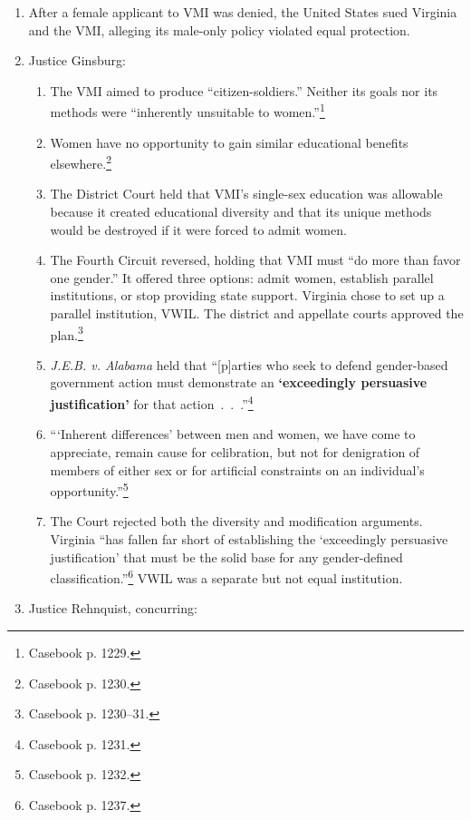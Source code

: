 \begin{enumerate}
    \item After a female applicant to VMI was denied, the United States sued 
    Virginia and the VMI, alleging its male-only policy violated equal 
    protection.
    \item Justice Ginsburg:
    \begin{enumerate}
        \item The VMI aimed to produce ``citizen-soldiers.'' Neither its goals 
        nor its methods were ``inherently unsuitable to 
        women.''\footnote{Casebook p. 1229.}
        \item Women have no opportunity to gain similar educational benefits 
        elsewhere.\footnote{Casebook p. 1230.}
        \item The District Court held that VMI's single-sex education was 
        allowable because it created educational diversity and that its unique 
        methods would be destroyed if it were forced to admit women.
        \item The Fourth Circuit reversed, holding that VMI must ``do more 
        than favor one gender.'' It offered three options: admit women, 
        establish parallel institutions, or stop providing state support. 
        Virginia chose to set up a parallel institution, VWIL. The district 
        and appellate courts approved the plan.\footnote{Casebook p. 1230--31.}
        \item \emph{J.E.B. v. Alabama} held that ``[p]arties who seek to 
        defend gender-based government action must demonstrate an 
        \textbf{`exceedingly persuasive justification'} for that 
        action~.~.~.''\footnote{Casebook p. 1231.}
        \item ```Inherent differences' between men and women, we have come to 
        appreciate, remain cause for celibration, but not for denigration of 
        members of either sex or for artificial constraints on an individual's 
        opportunity.''\footnote{Casebook p. 1232.}
        \item The Court rejected both the diversity and modification 
        arguments. Virginia ``has fallen far short of establishing the 
        `exceedingly persuasive justification' that must be the solid base for 
        any gender-defined classification.''\footnote{Casebook p. 1237.} VWIL 
        was a separate but not equal institution.
    \end{enumerate}
    \item Justice Rehnquist, concurring:

\end{enumerate}

